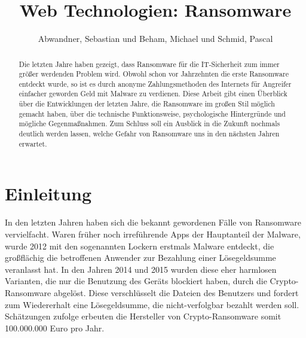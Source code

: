 \documentclass[runningheads,a4paper]{llncs}
\begin{document}


\title{Web Technologien: Ransomware}
{}

\author{Abwandner, Sebastian und Beham, Michael und Schmid, Pascal}


\maketitle

\begin{abstract}
Die letzten Jahre haben gezeigt, dass Ransomware für die IT-Sicherheit zum immer größer werdenden Problem wird. Obwohl schon vor Jahrzehnten die erste Ransomware entdeckt wurde, so ist es durch anonyme Zahlungsmethoden des Internets für Angreifer einfacher geworden Geld mit Malware zu verdienen. Diese Arbeit gibt einen Überblick über die Entwicklungen der letzten Jahre, die Ransomware im großen Stil möglich gemacht haben, über die technische Funktionsweise, psychologische Hintergründe und mögliche Gegenmaßnahmen. Zum Schluss soll ein Ausblick in die Zukunft nochmals deutlich werden lassen, welche Gefahr von Ransomware uns in den nächsten Jahren erwartet.
\end{abstract}

\section{Einleitung}\label{sec:intro}
In den letzten Jahren haben sich die bekannt gewordenen Fälle von Ransomware vervielfacht. Waren früher noch irreführende Apps der Hauptanteil der Malware, wurde 2012 mit den sogenannten Lockern erstmals Malware entdeckt, die großflächig die betroffenen Anwender zur Bezahlung einer Lösegeldsumme veranlasst hat. In den Jahren 2014 und 2015 wurden diese eher harmlosen Varianten, die nur die Benutzung des Geräts blockiert haben, durch die Crypto-Ransomware abgelöst. Diese verschlüsselt die Dateien des Benutzers und fordert zum Wiedererhalt eine Lösegeldsumme, die nicht-verfolgbar bezahlt werden soll. Schätzungen zufolge erbeuten die Hersteller von Crypto-Ransomware somit 100.000.000 Euro pro Jahr\cite{money}.
\end{document}
